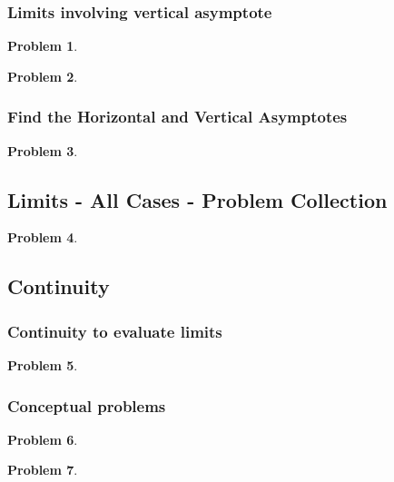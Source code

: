 \documentclass{article}
\newtheorem{problem}{Problem}
\begin{document}
\subsubsection{Limits involving vertical asymptote}\label{secMPSlimitsVerticalAsymptote}
\begin{problem}

\end{problem}
\begin{problem}

\end{problem}

\subsubsection{Find the Horizontal and Vertical Asymptotes}\label{secMPShorAndVertAsymptotes}
\begin{problem}

\end{problem}


\subsection{Limits - All Cases - Problem Collection}
\begin{problem}

\end{problem}
\subsection{Continuity}
\subsubsection{Continuity to evaluate limits}
\begin{problem}

\end{problem}

\subsubsection{Conceptual problems} \label{secMPScontinuityConceptual}
\begin{problem}

\end{problem}
\begin{problem}

\end{problem}
\end{document}
